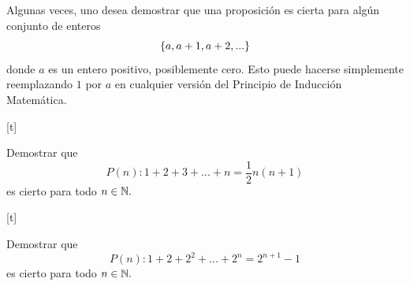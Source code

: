 	\begin{rem}
		Algunas veces, uno desea demostrar que una proposici\'on es cierta para alg\'un conjunto de enteros
		$$
		\left\{ a,a+1, a+2,... \right\}
		$$
		donde $a$ es un entero positivo, posiblemente cero. Esto puede hacerse simplemente reemplazando $1$ por $a$ en cualquier versi\'on del Principio de Inducci\'on Matem\'atica. 
	\end{rem}
	


[t]
	\begin{exmp}
		Demostrar que $$P(n): 1+2+3+...+n=\frac{1}{2}n\left( n+1 \right)$$
		es cierto para todo $n \in \mathbb{N}.$
	\end{exmp}
	


[t]
	\begin{exmp}
		Demostrar que $$P(n): 1+2+2^{2}+...+2^{n}=2^{n+1}-1$$
		es cierto para todo $n \in \mathbb{N}.$
	\end{exmp}
	

